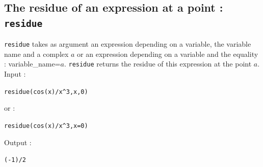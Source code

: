 \documentclass[a4paper,11pt]{book}
\begin{document}
\subsection{The residue of an expression at a point : {\tt residue}}
{\tt residue} takes as argument an expression depending on a variable, 
the variable name and a complex $a$ or an expression 
depending on a variable and the equality : variable\_name=$a$.
{\tt residue} returns the residue of this expression at the point $a$.\\
Input :
\begin{center}{\tt residue(cos(x)/x\verb|^|3,x,0)}\end{center}
or :
\begin{center}{\tt residue(cos(x)/x\verb|^|3,x=0)}\end{center}
Output :
\begin{center}{\tt (-1)/2}\end{center}
\end{document}
